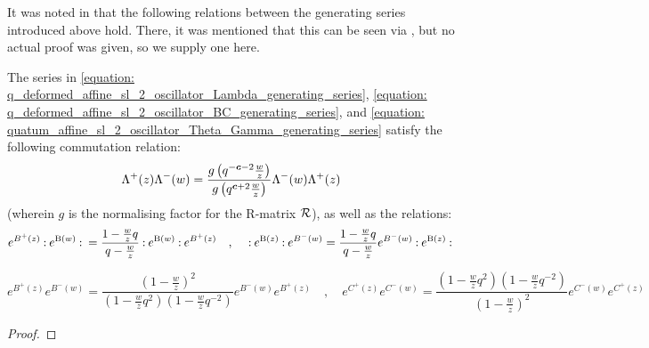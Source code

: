         It was noted in \cite{frenkel_reshetikhin_affine_QUEs_and_deformed_virasoro_and_finite_W_algebras} that the following relations between the generating series introduced above hold. There, it was mentioned that this can be seen via \cite{awata_odake_shiraishi_free_boson_realisation_of_quantum_affine_sl_N}, but no actual proof was given, so we supply one here.
        \begin{lemma} \label{lemma: q_deformed_affine_sl_2_oscillator_generating_series_commutation_relations}
            The series in \eqref{equation: q_deformed_affine_sl_2_oscillator_Lambda_generating_series}, \eqref{equation: q_deformed_affine_sl_2_oscillator_BC_generating_series}, and \eqref{equation: quatum_affine_sl_2_oscillator_Theta_Gamma_generating_series} satisfy the following commutation relation:
                \begin{equation} \label{equation: q_deformed_affine_sl_2_oscillator_Lambda_generating_series_commutators}
                    \Lambda^+(z) \Lambda^-(w) = \frac{ g\left( q^{-\boldsymbol{c} - 2} \frac{w}{z} \right) }{ g\left( q^{\boldsymbol{c} + 2} \frac{w}{z} \right) } \Lambda^-(w) \Lambda^+(z)
                \end{equation}
            (wherein $g$ is the normalising factor for the R-matrix $\mathcal{R}$), as well as the relations:
                \begin{equation} \label{equation: q_deformed_affine_sl_2_oscillator_BC_generating_series_commutators}
                    e^{ B^+(z) } \: \mathbf{:} \: { e^{\mathrm{B}(w)} }  \: \mathbf{:} \: = \frac{ 1 - \frac{w}{z} q }{ q - \frac{w}{z} } \: \mathbf{:} \: { e^{\mathrm{B}(w)} }  \: \mathbf{:} \: e^{ B^+(z) }
                    \quad, \quad
                    \: \mathbf{:} \: { e^{ \mathrm{B}(z) } }  \: \mathbf{:} \: e^{ B^-(w) } = \frac{ 1 - \frac{w}{z} q }{ q - \frac{w}{z} } e^{B^-(w)} \: \mathbf{:} \: { e^{ \mathrm{B}(z) } }  \: \mathbf{:} \:
                \end{equation}
                
                \begin{equation} \label{equation: quatum_affine_sl_2_oscillator_Theta_Gamma_generating_series_commutators}
                    e^{B^+(z)} e^{B^-(w)} = \frac{ \left(1 - \frac{w}{z}\right)^2 }{ \left( 1 - \frac{w}{z} q^2 \right) \left( 1 - \frac{w}{z} q^{-2} \right) } e^{B^-(w)} e^{B^+(z)}
                    \quad, \quad
                    e^{C^+(z)} e^{C^-(w)} = \frac{ \left( 1 - \frac{w}{z} q^2 \right) \left( 1 - \frac{w}{z} q^{-2} \right) }{ \left(1 - \frac{w}{z}\right)^2 } e^{C^-(w)} e^{C^+(z)}
                \end{equation}
        \end{lemma}
            \begin{proof}
                
            \end{proof}

